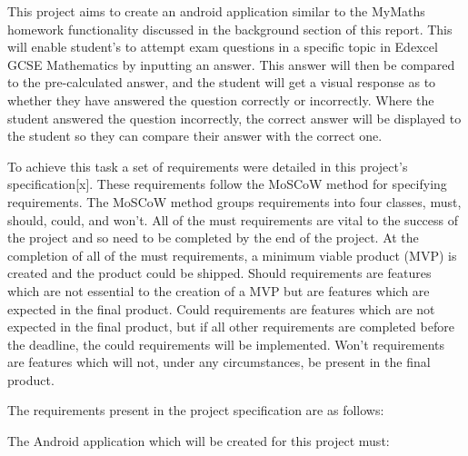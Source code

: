 \documentclass{article}
\begin{document}
This project aims to create an android application similar to the MyMaths homework functionality discussed in the background section of this report. This will enable student's to attempt exam questions in a specific topic in Edexcel GCSE Mathematics by inputting an answer. This answer will then be compared to the pre-calculated answer, and the student will get a visual response as to whether they have answered the question correctly or incorrectly. Where the student answered the question incorrectly, the correct answer will be displayed to the student so they can compare their answer with the correct one. \par

To achieve this task a set of requirements were detailed in this project's specification[x]. These requirements follow the MoSCoW method for specifying requirements. The MoSCoW method groups requirements into four classes, must, should, could, and won't. All of the must requirements are vital to the success of the project and so need to be completed by the end of the project. At the completion of all of the must requirements, a minimum viable product (MVP) is created and the product could be shipped. Should requirements are features which are not essential to the creation of a MVP but are features which are expected in the final product. Could requirements are features which are not expected in the final product, but if all other requirements are completed before the deadline, the could requirements will be implemented. Won't requirements are features which will not, under any circumstances, be present in the final product. \par

The requirements present in the project specification are as follows: \par

The Android application which will be created for this project must: 
\end{document}
